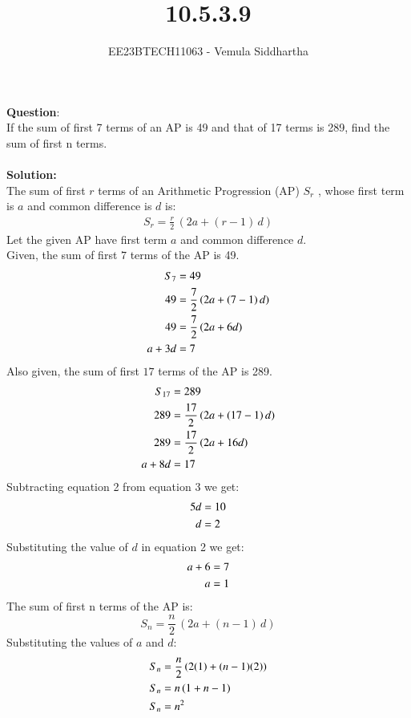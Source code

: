 \documentclass[journal,12pt,twocolumn]{IEEEtran}
\theoremstyle{remark}
\begin{document}

\vspace{3cm}

\title{10.5.3.9}
\author{EE23BTECH11063 - Vemula Siddhartha
}
\maketitle
\newpage
\bigskip

\renewcommand{\thefigure}{\theenumi}
\renewcommand{\thetable}{\theenumi}
\textbf{Question}:\\
If the sum of first 7 terms of an AP is 49 and that of 17 terms is 289, find the sum of
first n terms.
\\\\
\textbf{Solution: }\\
The sum of first $r$ terms of an Arithmetic Progression (AP) $S_r$ , whose first term is $a$ and common difference is $d$ is:
\begin{align}
S_r=\frac{r}{2}\,(2a+(r-1)\,d)
\end{align}
Let the given AP have first term $a$ and common difference $d$.\\
Given, the sum of first $7$ terms of the AP is 49.
\begin{align}
S_7&=49\notag\\
49&=\frac{7}{2}\,(2a+(7-1)\,d)\notag\\
49&=\frac{7}{2}\,(2a+6d)\notag\\
a+3d&=7
\end{align}
Also given, the sum of first $17$ terms of the AP is 289.
\begin{align}
	S_{17}&=289\notag\\
	289&=\frac{17}{2}\,(2a+(17-1)\,d)\notag\\
	289&=\frac{17}{2}\,(2a+16d)\notag\\
	a+8d&=17
\end{align}
Subtracting equation 2 from equation 3 we get:
\begin{align}
	5d&=10\notag\\
	d&=2
\end{align}
Substituting the value of $d$ in equation 2 we get:
\begin{align}
	a+6&=7\notag\\
	a&=1
\end{align}
The sum of first n terms of the AP is:
\[S_n= \frac{n}{2}\,(2a+(n-1)\,d)\]
Substituting the values of $a$ and $d$:
\begin{align}
&S_n=\frac{n}{2}\,(2(1)+(n-1)(2))\notag\\
&S_n=n\,(1+n-1)\notag\\
&S_n=n^2
\end{align}
\end{document}
